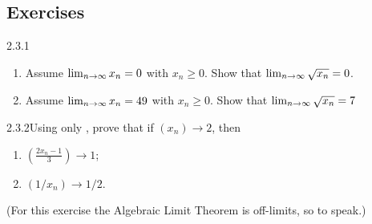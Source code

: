 \subsection{Exercises}

\begin{exercise}
    {2.3.1}
    \begin{enumerate}
        \item Assume \(\lim_{n \rightarrow \infty}x_n = 0\) with \(x_n \geq 0\). Show that \(\lim_{n \rightarrow \infty}\sqrt{x_n} = 0\).
        \item Assume \(\lim_{n \rightarrow \infty}x_n = 49\) with \(x_n \geq 0\). Show that \(\lim_{n \rightarrow \infty}\sqrt{x_n} = 7\)
    \end{enumerate}
\end{exercise}


\begin{exercise}
    {2.3.2}Using only , prove that if \((x_n) \rightarrow 2\), then
    \begin{enumerate}
        \item \(\displaystyle \left(\frac{2x_n - 1}{3}\right) \rightarrow 1\);
        \item \(\displaystyle \left(1 / x_n\right) \rightarrow 1 / 2\).
    \end{enumerate}
    (For this exercise the Algebraic Limit Theorem is off-limits, so to speak.)
\end{exercise}

